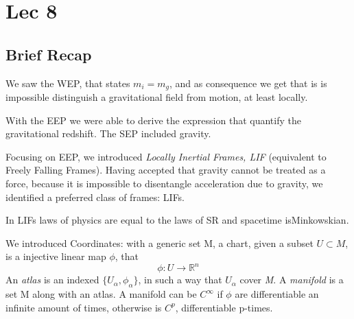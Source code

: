 \section{Lec 8}
\subsection{Brief Recap}
We saw the WEP, that states $m_{i}= m_{g}$, and as consequence we get that is is impossible distinguish a gravitational field from motion, at least locally. \par
With the EEP we were able to derive the expression that quantify the gravitational redshift.
The SEP included gravity.\par

Focusing on EEP, we introduced \emph{Locally Inertial Frames, LIF} (equivalent to Freely Falling Frames).
Having accepted that gravity cannot be treated as a force, because it is impossible to disentangle acceleration due to gravity, we identified a preferred class of frames: LIFs.\par
In LIFs laws of physics are equal to the laws of SR and spacetime is\break Minkowskian.

We introduced Coordinates: with a generic set M, a chart, given a subset $U \subset M $, is a injective linear  map $\phi $, that \[
\phi : U \to \mathbb{R}^{n}
\]
An \emph{atlas }is an indexed $\{U_{\alpha}, \phi_{\alpha }\}$, in such a way that $U_{\alpha }$ cover \emph{M}.
A \emph{manifold} is a set M along with an atlas. A manifold can be $C^{\infty}$ if $\phi $ are differentiable an infinite amount of times, otherwise is $C^{p}$, differentiable p-times.
